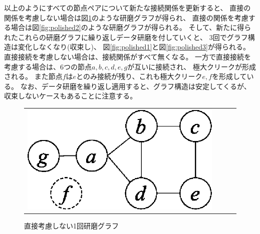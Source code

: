 以上のようにすべての節点ペアについて新たな接続関係を更新すると、
直接の関係を考慮しない場合は図\ref{fig:polished0}のような研磨グラフが得られ、
直接の関係を考慮する場合は図\ref{fig:polished2}のような研磨グラフが得られる。
そして、新たに得られたこれらの研磨グラフに繰り返しデータ研磨を付していくと、
3回でグラフ構造は変化しなくなり(収束し)、
図\ref{fig:polished1}と図\ref{fig:polished3}が得られる。
直接接続を考慮しない場合は、接続関係がすべて無くなる。
一方で直接接続を考慮する場合は、6つの節点$a,b,c,d,e,g$が互いに接続され、
極大クリークが形成される。
また節点$f$は$e$とのみ接続が残り、これも極大クリーク$e,f$を形成している。
なお、データ研磨を繰り返し適用すると、グラフ構造は安定してくるが、
収束しないケースもあることに注意する。

\begin{figure}[htbp]
\begin{center}
\begin{tabular}{cccc}

\begin{minipage}{0.25\hsize}
\begin{center}
\includegraphics[scale=0.5]{./polished0.eps}
\caption{直接考慮しない1回研磨グラフ\label{fig:polished0}}
\end{center}
\end{minipage}


\end{tabular}
\end{center}
\end{figure}
